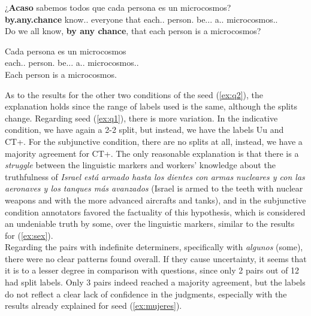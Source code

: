 \begin{exe}
    \ex\label{ex:q2}
    \begin{xlist}
      \item{\gll ¿\textbf{Acaso} sabemos todos que cada persona es un microcosmos?\\ \textbf{by.any.chance} know.\F.\Sg{} everyone that each.\F.\Sg{} person\F.\Sg{} be.\Prs.\Ind.\Tsg{} a.\M.\Sg{} microcosmos.\M.\Sg{} \\\glt Do we all know, \textbf{by any chance}, that each person is a microcosmos?}
      \item{\gll Cada persona es un microcosmos\\ each.\F.\Sg{} person\F.\Sg{} be.\Prs.\Ind.\Tsg{} a.\M.\Sg{} microcosmos.\M.\Sg{} \\\glt Each person is a microcosmos.} \label{ex:hypq2}
    \end{xlist}
\end{exe}

As to the results for the other two conditions of the seed (\ref{ex:q2}), the explanation holds since the range of labels used is the same, although the splits change. Regarding seed (\ref{ex:q1}), there is more variation. In the indicative condition, we have again a 2-2 split, but instead, we have the labels Uu and CT+. For the subjunctive condition, there are no splits at all, instead, we have a majority agreement for CT+. The only reasonable explanation is that there is a \textit{struggle} between the linguistic markers and workers' knowledge about the truthfulness of \textit{Israel está armado hasta los dientes con armas nucleares y con las aeronaves y los tanques más avanzados} (Israel is armed to the teeth with nuclear weapons and with the more advanced aircrafts and tanks), and in the subjunctive condition annotators favored the factuality of this hypothesis, which is considered an undeniable truth by some, over the linguistic markers, similar to the results for (\ref{ex:sex}).\\

Regarding the pairs with indefinite determiners, specifically with \textit{algunos} (some), there were no clear patterns found overall. If they cause uncertainty, it seems that it is to a lesser degree in comparison with questions, since only 2 pairs out of 12 had split labels. Only 3 pairs indeed reached a majority agreement, but the labels do not reflect a clear lack of confidence in the judgments, especially with the results already explained for seed (\ref{ex:mujeres}).\\

